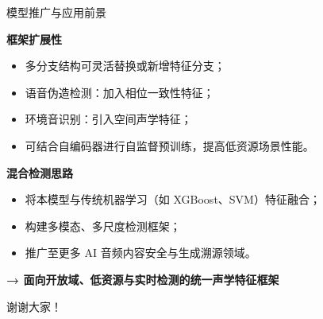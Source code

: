 \documentclass[aspectratio=169]{beamer}
\providecommand{\paragraph}[1]{\smallskip\textbf{#1}\par}
\begin{document}
\begin{frame}{模型推广与应用前景}

\small
\paragraph{框架扩展性}
\begin{itemize}
  \item 多分支结构可灵活替换或新增特征分支；
  \item 语音伪造检测：加入相位一致性特征；
  \item 环境音识别：引入空间声学特征；
  \item 可结合自编码器进行自监督预训练，提高低资源场景性能。
\end{itemize}

\vspace{0.6em}
\paragraph{混合检测思路}
\begin{itemize}
  \item 将本模型与传统机器学习（如 XGBoost、SVM）特征融合；
  \item 构建多模态、多尺度检测框架；
  \item 推广至更多 AI 音频内容安全与生成溯源领域。
\end{itemize}

\vspace{0.8em}
\centering
{\Large \textbf{→ 面向开放域、低资源与实时检测的统一声学特征框架}}
\end{frame}

\begin{frame}[standout]
  谢谢大家！
\end{frame}
\end{document}
